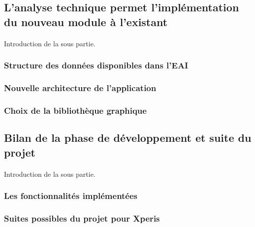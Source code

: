	\subsection{L'analyse technique permet l'implémentation du nouveau module à l'existant}
		\paragraph{}
		Introduction de la sous partie.
		
		\subsubsection{Structure des données disponibles dans l'EAI}
		\subsubsection{Nouvelle architecture de l'application}
		\subsubsection{Choix de la bibliothèque graphique}
	
	\subsection{Bilan de la phase de développement et suite du projet}
		\paragraph{}
		Introduction de la sous partie.
		
		\subsubsection{Les fonctionnalités implémentées}
		\subsubsection{Suites possibles du projet pour Xperis}
